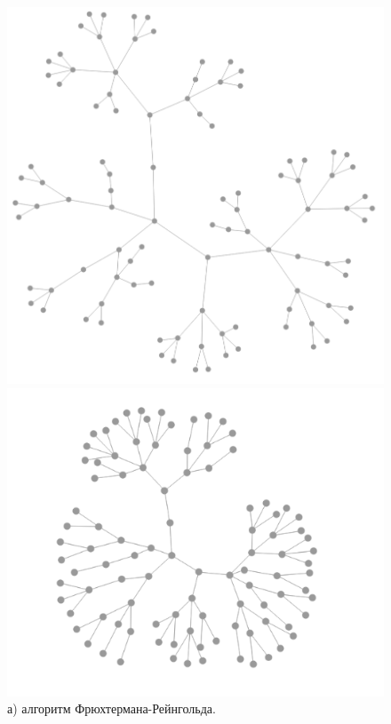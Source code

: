 \documentclass[14pt, russian]{scrartcl}
\begin{document}
\begin{figure}[H]
	\centering
	\begin{minipage}[t]{.48\textwidth}
		\centering
		\includegraphics[width=\linewidth]{./imgs/fr_quad_tree.png}
		\caption*{а) алгоритм Фрюхтермана-Рейнгольда.}
	\end{minipage}
	\noindent
	\begin{minipage}[t]{.50\textwidth}
		\centering
		\includegraphics[width=\linewidth]{./imgs/kk_quad_tree.png}

\end{minipage}
\end{figure}
\end{document}
